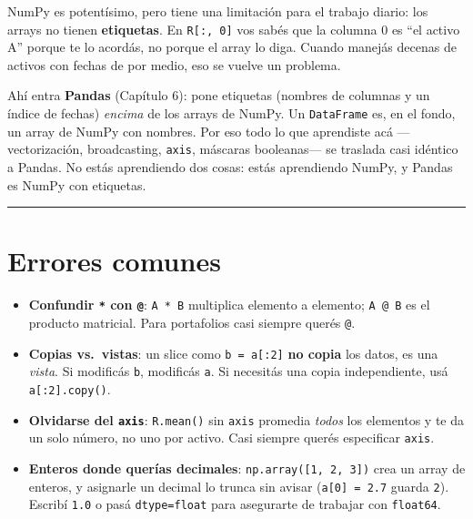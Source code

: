 \documentclass[
  spanish,
  letterpaper,
  DIV=11,
  numbers=noendperiod]{scrreprt}
\providecommand{\tightlist}{%
  \setlength{\itemsep}{0pt}\setlength{\parskip}{0pt}}
\begin{document}
NumPy es potentísimo, pero tiene una limitación para el trabajo diario:
los arrays no tienen \textbf{etiquetas}. En \texttt{R{[}:,\ 0{]}} vos
sabés que la columna 0 es ``el activo A'' porque te lo acordás, no
porque el array lo diga. Cuando manejás decenas de activos con fechas de
por medio, eso se vuelve un problema.

Ahí entra \textbf{Pandas} (Capítulo 6): pone etiquetas (nombres de
columnas y un índice de fechas) \emph{encima} de los arrays de NumPy. Un
\texttt{DataFrame} es, en el fondo, un array de NumPy con nombres. Por
eso todo lo que aprendiste acá ---vectorización, broadcasting,
\texttt{axis}, máscaras booleanas--- se traslada casi idéntico a Pandas.
No estás aprendiendo dos cosas: estás aprendiendo NumPy, y Pandas es
NumPy con etiquetas.

\begin{center}\rule{0.5\linewidth}{0.5pt}\end{center}

\section{Errores comunes}\label{errores-comunes-3}

\begin{tcolorbox}[enhanced jigsaw, bottomrule=.15mm, colback=white, opacitybacktitle=0.6, arc=.35mm, toprule=.15mm, opacityback=0, breakable, titlerule=0mm, left=2mm, coltitle=black, colbacktitle=quarto-callout-warning-color!10!white, colframe=quarto-callout-warning-color-frame, leftrule=.75mm, toptitle=1mm, bottomtitle=1mm, title=\textcolor{quarto-callout-warning-color}{\faExclamationTriangle}\hspace{0.5em}{Trampas frecuentes con NumPy}, rightrule=.15mm]

\begin{itemize}
\tightlist
\item
  \textbf{Confundir \texttt{*} con \texttt{@}}: \texttt{A\ *\ B}
  multiplica elemento a elemento; \texttt{A\ @\ B} es el producto
  matricial. Para portafolios casi siempre querés \texttt{@}.
\item
  \textbf{Copias vs.~vistas}: un slice como \texttt{b\ =\ a{[}:2{]}}
  \textbf{no copia} los datos, es una \emph{vista}. Si modificás
  \texttt{b}, modificás \texttt{a}. Si necesitás una copia
  independiente, usá \texttt{a{[}:2{]}.copy()}.
\item
  \textbf{Olvidarse del \texttt{axis}}: \texttt{R.mean()} sin
  \texttt{axis} promedia \emph{todos} los elementos y te da un solo
  número, no uno por activo. Casi siempre querés especificar
  \texttt{axis}.
\item
  \textbf{Enteros donde querías decimales}:
  \texttt{np.array({[}1,\ 2,\ 3{]})} crea un array de enteros, y
  asignarle un decimal lo trunca sin avisar (\texttt{a{[}0{]}\ =\ 2.7}
  guarda \texttt{2}). Escribí \texttt{1.0} o pasá \texttt{dtype=float}
  para asegurarte de trabajar con \texttt{float64}.
\end{itemize}

\end{tcolorbox}
\end{document}
